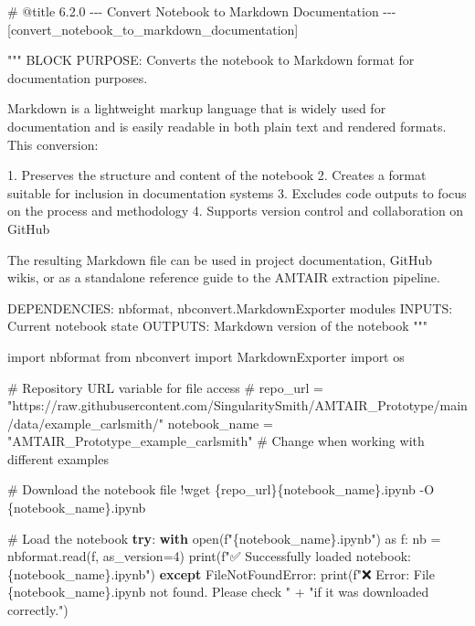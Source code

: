 \documentclass[
  11pt,
  letterpaper,
]{book}
\newenvironment{Shaded}{\begin{snugshade}}{\end{snugshade}}
\newcommand{\BuiltInTok}[1]{\textcolor[rgb]{0.00,0.23,0.31}{#1}}
\newcommand{\CommentTok}[1]{\textcolor[rgb]{0.37,0.37,0.37}{#1}}
\newcommand{\ControlFlowTok}[1]{\textcolor[rgb]{0.00,0.23,0.31}{\textbf{#1}}}
\newcommand{\DecValTok}[1]{\textcolor[rgb]{0.68,0.00,0.00}{#1}}
\newcommand{\ImportTok}[1]{\textcolor[rgb]{0.00,0.46,0.62}{#1}}
\newcommand{\NormalTok}[1]{\textcolor[rgb]{0.00,0.23,0.31}{#1}}
\newcommand{\OperatorTok}[1]{\textcolor[rgb]{0.37,0.37,0.37}{#1}}
\newcommand{\PreprocessorTok}[1]{\textcolor[rgb]{0.68,0.00,0.00}{#1}}
\newcommand{\SpecialCharTok}[1]{\textcolor[rgb]{0.37,0.37,0.37}{#1}}
\newcommand{\SpecialStringTok}[1]{\textcolor[rgb]{0.13,0.47,0.30}{#1}}
\newcommand{\StringTok}[1]{\textcolor[rgb]{0.13,0.47,0.30}{#1}}
\begin{document}
\label{convert_notebook_to_markdown_documentation}
\begin{Shaded}
\begin{Highlighting}[]
\CommentTok{\# @title 6.2.0 {-}{-}{-} Convert Notebook to Markdown Documentation {-}{-}{-} [convert\_notebook\_to\_markdown\_documentation]}

\CommentTok{"""}
\CommentTok{BLOCK PURPOSE: Converts the notebook to Markdown format for documentation purposes.}

\CommentTok{Markdown is a lightweight markup language that is widely used for documentation}
\CommentTok{and is easily readable in both plain text and rendered formats. This conversion:}

\CommentTok{1. Preserves the structure and content of the notebook}
\CommentTok{2. Creates a format suitable for inclusion in documentation systems}
\CommentTok{3. Excludes code outputs to focus on the process and methodology}
\CommentTok{4. Supports version control and collaboration on GitHub}

\CommentTok{The resulting Markdown file can be used in project documentation, GitHub wikis,}
\CommentTok{or as a standalone reference guide to the AMTAIR extraction pipeline.}

\CommentTok{DEPENDENCIES: nbformat, nbconvert.MarkdownExporter modules}
\CommentTok{INPUTS: Current notebook state}
\CommentTok{OUTPUTS: Markdown version of the notebook}
\CommentTok{"""}

\ImportTok{import}\NormalTok{ nbformat}
\ImportTok{from}\NormalTok{ nbconvert }\ImportTok{import}\NormalTok{ MarkdownExporter}
\ImportTok{import}\NormalTok{ os}

\CommentTok{\# Repository URL variable for file access}
\CommentTok{\# repo\_url = "https://raw.githubusercontent.com/SingularitySmith/AMTAIR\_Prototype/main/data/example\_carlsmith/"}
\NormalTok{notebook\_name }\OperatorTok{=} \StringTok{"AMTAIR\_Prototype\_example\_carlsmith"}  \CommentTok{\# Change when working with different examples}

\CommentTok{\# Download the notebook file}
\OperatorTok{!}\NormalTok{wget \{repo\_url\}\{notebook\_name\}.ipynb }\OperatorTok{{-}}\NormalTok{O \{notebook\_name\}.ipynb}

\CommentTok{\# Load the notebook}
\ControlFlowTok{try}\NormalTok{:}
  \ControlFlowTok{with} \BuiltInTok{open}\NormalTok{(}\SpecialStringTok{f"}\SpecialCharTok{\{}\NormalTok{notebook\_name}\SpecialCharTok{\}}\SpecialStringTok{.ipynb"}\NormalTok{) }\ImportTok{as}\NormalTok{ f:}
\NormalTok{    nb }\OperatorTok{=}\NormalTok{ nbformat.read(f, as\_version}\OperatorTok{=}\DecValTok{4}\NormalTok{)}
  \BuiltInTok{print}\NormalTok{(}\SpecialStringTok{f"✅ Successfully loaded notebook: }\SpecialCharTok{\{}\NormalTok{notebook\_name}\SpecialCharTok{\}}\SpecialStringTok{.ipynb"}\NormalTok{)}
\ControlFlowTok{except} \PreprocessorTok{FileNotFoundError}\NormalTok{:}
  \BuiltInTok{print}\NormalTok{(}\SpecialStringTok{f"❌ Error: File \textquotesingle{}}\SpecialCharTok{\{}\NormalTok{notebook\_name}\SpecialCharTok{\}}\SpecialStringTok{.ipynb\textquotesingle{} not found. Please check "}
    \OperatorTok{+} \StringTok{"if it was downloaded correctly."}\NormalTok{)}



\end{Highlighting}
\end{Shaded}
\end{document}
